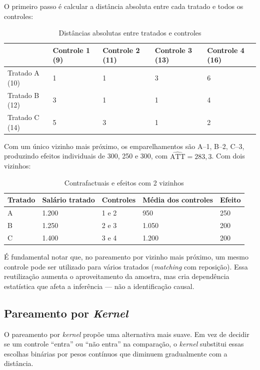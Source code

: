 \documentclass[12pt,a4paper]{article}
\begin{document}
O primeiro passo é calcular a distância absoluta entre cada tratado e todos os controles:

\begin{table}[H]
\centering
\caption{Distâncias absolutas entre tratados e controles}\label{tab:distancias}
\begin{tabular}{lllll}
\toprule
 & Controle 1 (9) & Controle 2 (11) & Controle 3 (13) & Controle 4 (16) \\
\midrule
Tratado A (10) & 1 & 1 & 3 & 6 \\
Tratado B (12) & 3 & 1 & 1 & 4 \\
Tratado C (14) & 5 & 3 & 1 & 2 \\
\bottomrule
\end{tabular}
\end{table}

Com um único vizinho mais próximo, os emparelhamentos são A--1, B--2, C--3, produzindo efeitos individuais de 300, 250 e 300, com $\widehat{\text{ATT}} = 283{,}3$. Com dois vizinhos:

\begin{table}[H]
\centering
\caption{Contrafactuais e efeitos com 2 vizinhos}\label{tab:nn2viz}
\begin{tabular}{lllll}
\toprule
Tratado & Salário tratado & Controles & Média dos controles & Efeito \\
\midrule
A & 1.200 & 1 e 2 & 950   & 250 \\
B & 1.250 & 2 e 3 & 1.050 & 200 \\
C & 1.400 & 3 e 4 & 1.200 & 200 \\
\bottomrule
\end{tabular}
\end{table}

É fundamental notar que, no pareamento por vizinho mais próximo, um mesmo controle pode ser utilizado para vários tratados (\textit{matching} com reposição). Essa reutilização aumenta o aproveitamento da amostra, mas cria dependência estatística que afeta a inferência --- não a identificação causal.

\subsection{Pareamento por \textit{Kernel}}

O pareamento por \textit{kernel} propõe uma alternativa mais suave. Em vez de decidir se um controle ``entra'' ou ``não entra'' na comparação, o \textit{kernel} substitui essas escolhas binárias por pesos contínuos que diminuem gradualmente com a distância.
\end{document}
